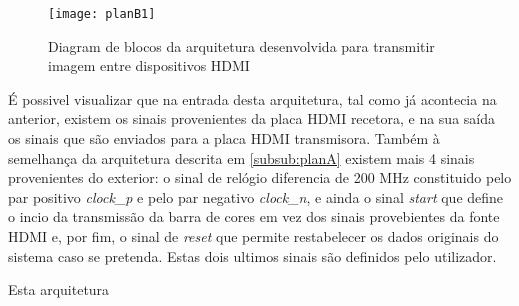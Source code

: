 \begin{figure}[h!]
	\begin{center}
		\leavevmode
		\texttt{[image: planB1]}
		\caption{Diagram de blocos da arquitetura desenvolvida para transmitir imagem entre dispositivos HDMI}
		\label{fig:planb1}
	\end{center}
\end{figure}
É possivel visualizar que na entrada desta arquitetura, tal como já acontecia na anterior, existem os sinais provenientes da placa HDMI recetora, e na sua saída os sinais que são enviados para a placa HDMI transmisora. Também à semelhança da arquitetura descrita em \ref{subsub:planA} existem mais 4 sinais provenientes do exterior: o sinal de relógio diferencia de 200 MHz constituido pelo par positivo \textit{clock\_p} e pelo par negativo \textit{clock\_n}, e ainda o sinal \textit{start} que define o incio da transmissão da barra de cores em vez dos sinais provebientes da fonte HDMI e, por fim, o sinal de \textit{reset} que permite restabelecer os dados originais do sistema caso se pretenda. Estas dois ultimos sinais são definidos pelo utilizador.

Esta arquitetura 
%
%



